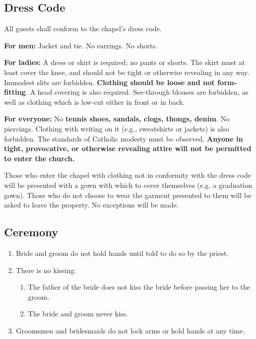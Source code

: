 \documentclass{article}
\begin{document}
\subsection{Dress Code}

All guests shall conform to the chapel's dress code.

\begin{framed} 

    \textbf{For men:} Jacket and tie. No earrings. No shorts. 

    \textbf{For ladies:} A dress or skirt is required; no pants or shorts. The
    skirt must at least cover the knee, and should not be tight or otherwise
    revealing in any way. Immodest slits are forbidden. \textbf{Clothing should
    be loose and not form-fitting}. A head covering is also required.
    See-through blouses are forbidden, as well as clothing which is low-cut
    either in front or in back.
    
    \textbf{For everyone:} No \textbf{tennis shoes, sandals, clogs, thongs,
    denim}. No piercings. Clothing with writing on it (e.g., sweatshirts or
    jackets) is also forbidden. The standards of Catholic modesty must be
    observed. \textbf{Anyone in tight, provocative, or otherwise revealing
    attire will not be permitted to enter the church.} 

\end{framed}

Those who enter the chapel with clothing not in conformity with the dress code
will be presented with a gown with which to cover themselves (e.g. a graduation
gown). Those who do not choose to wear the garment presented to them will be
asked to leave the property. No exceptions will be made.

\subsection{Ceremony}

\begin{enumerate}
    \item Bride and groom do not hold hands until told to do so by the
        priest.
    \item There is no kissing:
        \begin{enumerate}
            \item The father of the bride does not kiss the bride before passing
                her to the groom.
            \item The bride and groom never kiss.
        \end{enumerate}
    \item Groomsmen and bridesmaids do not lock arms or hold hands at any time.
\end{enumerate}
\end{document}
